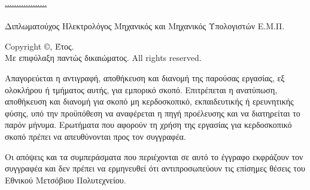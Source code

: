 \thispagestyle{empty}

\underline{..................}\\
\myAuthor\\
Διπλωματούχος Ηλεκτρολόγος Μηχανικός και Μηχανικός Υπολογιστών Ε.Μ.Π.

\vspace*{\fill}
\foreignlanguage{english}{Copyright} \copyright \myAuthor, Έτος.\\
Με επιφύλαξη παντώς δικαιώματος. \foreignlanguage{english}{All rights reserved}.

Απαγορεύεται η αντιγραφή, αποθήκευση και διανομή της παρούσας εργασίας, εξ ολοκλήρου ή
τμήματος αυτής, για εμπορικό σκοπό. Επιτρέπεται η ανατύπωση, αποθήκευση και διανομή για
σκοπό μη κερδοσκοπικό, εκπαιδευτικής ή ερευνητικής φύσης, υπό την προϋπόθεση να αναφέρεται
η πηγή προέλευσης και να διατηρείται το παρόν μήνυμα. Ερωτήματα που αφορούν τη χρήση της
εργασίας για κερδοσκοπικό σκοπό πρέπει να απευθύνονται προς τον συγγραφέα.


Οι απόψεις και τα συμπεράσματα που περιέχονται σε αυτό το έγγραφο εκφράζουν τον συγγραφέα
και δεν πρέπει να ερμηνευθεί ότι αντιπροσωπεύουν τις επίσημες θέσεις του Εθνικού Μετσόβιου Πολυτεχνείου.
\vspace{1cm}
\newpage